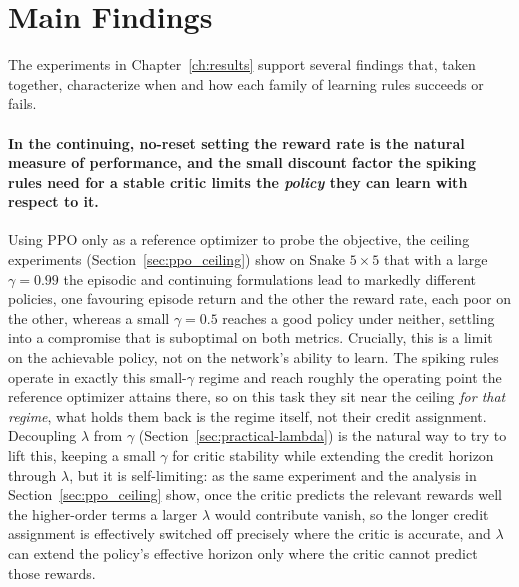 \clearpage
\section{Main Findings}
\label{sec:main_findings}

The experiments in Chapter~\ref{ch:results} support several
findings that, taken together, characterize when and how each family of
learning rules succeeds or fails.

\paragraph{In the continuing, no-reset setting the reward rate is the natural measure of performance,
and the small discount factor the spiking rules need for a stable critic limits the \emph{policy}
they can learn with respect to it.} Using PPO only as a reference optimizer to probe the objective, the ceiling
experiments (Section~\ref{sec:ppo_ceiling}) show on Snake $5\times5$ that with a large
$\gamma = 0.99$ the episodic and continuing formulations lead to markedly different policies, one
favouring episode return and the other the reward rate, each poor on the other, whereas a small
$\gamma = 0.5$ reaches a good policy under neither, settling into a compromise that is suboptimal on
both metrics. Crucially, this is a limit on the achievable policy, not on the network's ability to
learn. The spiking rules
operate in exactly this small-$\gamma$ regime and reach roughly the operating point the reference
optimizer attains there, so on this task they sit near the ceiling \emph{for that regime}, what holds
them back is the regime itself, not their credit assignment. Decoupling $\lambda$ from $\gamma$
(Section~\ref{sec:practical-lambda}) is the natural way to try to lift this, keeping a small $\gamma$
for critic stability while extending the credit horizon through $\lambda$, but it is self-limiting:
as the same experiment and the analysis in Section~\ref{sec:ppo_ceiling} show, once the
critic predicts the relevant rewards well the higher-order terms a larger $\lambda$ would contribute
vanish, so the longer credit assignment is effectively switched off precisely where the critic is
accurate, and $\lambda$ can extend the policy's effective horizon only where the critic cannot
predict those rewards.

